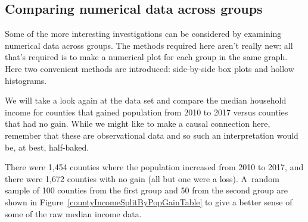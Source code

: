 
\subsection{Comparing numerical data across groups}
\label{comparingAcrossGroups}


Some of the more interesting investigations can be considered
by examining numerical data across groups.
The methods required here aren't really new:
all that's required is to make a numerical plot for each group
in the same graph.
Here two convenient methods are introduced:
side-by-side box plots and hollow histograms.

We will take a look again at the  data set
and compare the median household income for counties that
gained population from 2010 to 2017 versus counties that
had no gain.
While we might like to make a causal connection here,
remember that these are observational data and so such
an interpretation would be, at best, half-baked.

\newcommand{\numcountieswithgains}{1454}
\newcommand{\numcountieswithgainsC}{1,454}
\newcommand{\numcountieswithoutgains}{1672}
\newcommand{\numcountieswithoutgainsC}{1,672}

There were \numcountieswithgainsC{} counties where
the population increased from 2010 to 2017, and there
were \numcountieswithoutgainsC{} counties with no gain
(all but one were a loss).
A~random sample of 100 counties from the first group and
50 from the second group are shown in
Figure~\ref{countyIncomeSplitByPopGainTable}
to give a better sense of some of the raw median
income data.

